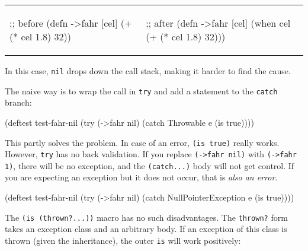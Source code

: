 \else

\begin{english}

\noindent
\begin{tabular}{ @{}p{5cm} @{}p{5cm} }


  \begin{clojure}
;; before
(defn ->fahr [cel]
  (+ (* cel 1.8) 32))
  \end{clojure}

&

  \begin{clojure}
;; after
(defn ->fahr [cel]
  (when cel
    (+ (* cel 1.8) 32)))
  \end{clojure}

\end{tabular}

\end{english}

\fi


\noindent
In this case, \verb|nil| drops down the call stack, making it harder to find the cause.

The naive way is to wrap the call in \verb|try| and add a statement to the \verb|catch| branch:

\begin{english}
  \begin{clojure}
(deftest test-fahr-nil
  (try
    (->fahr nil)
    (catch Throwable e
      (is true))))
  \end{clojure}
\end{english}

This partly solves the problem. In case of an error, \verb|(is true)| really works. However, \verb|try| has no back validation. If you replace \verb|(->fahr nil)| with \verb|(->fahr 1)|, there will be no exception, and the \verb|(catch...)|  body will not get control. If you are expecting an exception but it does not occur, that is \emph{also an error}.


\begin{english}
  \begin{clojure}
(deftest test-fahr-nil
  (try
    (->fahr nil)
    (catch NullPointerException e
      (is true))))
  \end{clojure}
\end{english}

The \verb|(is (thrown?...))| macro has no such disadvantages. The \verb|thrown?| form takes an exception class and an arbitrary body. If an exception of this class is thrown (given the inheritance), the outer \verb|is| will work positively:

